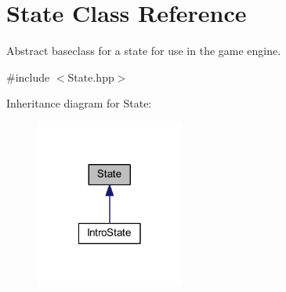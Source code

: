 \hypertarget{class_state}{\section{State Class Reference}
\label{class_state}
}


Abstract baseclass for a state for use in the game engine.  




{\ttfamily \#include $<$State.\-hpp$>$}



Inheritance diagram for State\-:
\nopagebreak
\begin{figure}[H]
\begin{center}
\leavevmode
\includegraphics[width=138pt]{class_state__inherit__graph}
\end{center}
\end{figure}
